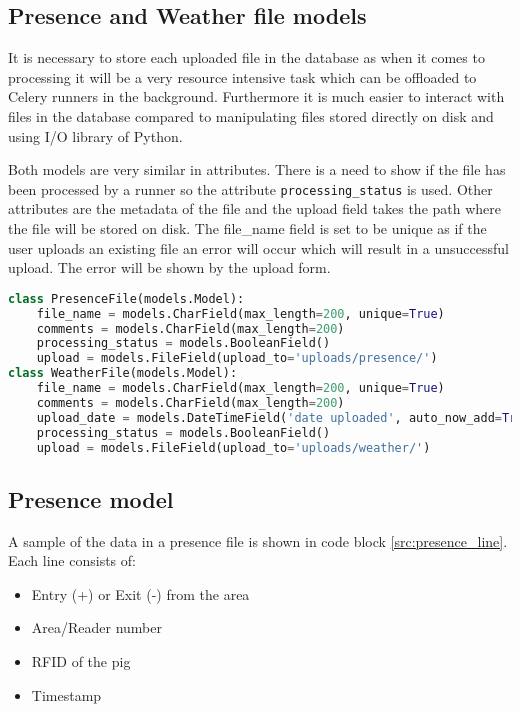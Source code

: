 \subsection{Presence and Weather file models}
It is necessary to store each uploaded file in the database as when it comes to processing it will be a very resource intensive task
which can be offloaded to Celery runners in the background. Furthermore it is much easier to interact with files in the database compared to
manipulating files stored directly on disk and using I/O library of Python.

Both models are very similar in attributes. There is a need to show if the file
has been processed by a runner so the attribute \texttt{processing\_status} is
used. Other attributes are the metadata of the file and the upload field takes
the path where the file will be stored on disk. The file\_name field is set to be
unique as if the user uploads an existing file an error will occur which will
result in a unsuccessful upload. The error will be shown by the upload form.

\begin{lstlisting}[language={Python}]
class PresenceFile(models.Model):
    file_name = models.CharField(max_length=200, unique=True)
    comments = models.CharField(max_length=200)
    processing_status = models.BooleanField()
    upload = models.FileField(upload_to='uploads/presence/')
class WeatherFile(models.Model):
    file_name = models.CharField(max_length=200, unique=True)
    comments = models.CharField(max_length=200)
    upload_date = models.DateTimeField('date uploaded', auto_now_add=True)
    processing_status = models.BooleanField()
    upload = models.FileField(upload_to='uploads/weather/')
\end{lstlisting}
	
\subsection{Presence model}
A sample of the data in a presence file is shown in code block \ref{src:presence_line}. Each line consists of:
\begin{itemize}
    \item Entry (+) or Exit (-) from the area
    \item Area/Reader number
    \item RFID of the pig
    \item Timestamp
\end{itemize}

